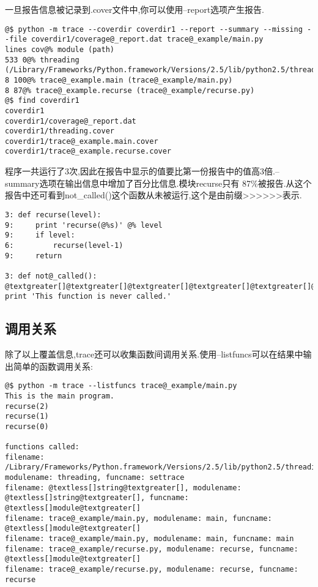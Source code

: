 \documentclass[letterpaper,10pt,english]{manual}
\begin{document}
一旦报告信息被记录到.cover文件中,你可以使用--report选项产生报告.

\begin{Verbatim}[commandchars=@\[\]]
@$ python -m trace --coverdir coverdir1 --report --summary --missing --file coverdir1/coverage@_report.dat trace@_example/main.py
lines cov@% module (path)
533 0@% threading (/Library/Frameworks/Python.framework/Versions/2.5/lib/python2.5/threading.py)
8 100@% trace@_example.main (trace@_example/main.py)
8 87@% trace@_example.recurse (trace@_example/recurse.py)
@$ find coverdir1
coverdir1
coverdir1/coverage@_report.dat
coverdir1/threading.cover
coverdir1/trace@_example.main.cover
coverdir1/trace@_example.recurse.cover
\end{Verbatim}

程序一共运行了3次,因此在报告中显示的值要比第一份报告中的值高3倍.--summary选项在输出信息中增加了百分比信息.模块recurse只有 87\%被报告.从这个报告中还可看到not\_called()这个函数从未被运行,这个是由前缀\textgreater{}\textgreater{}\textgreater{}\textgreater{}\textgreater{}\textgreater{}表示.

\begin{Verbatim}[commandchars=@\[\]]
3: def recurse(level):
9:     print 'recurse(@%s)' @% level
9:     if level:
6:         recurse(level-1)
9:     return

3: def not@_called():
@textgreater[]@textgreater[]@textgreater[]@textgreater[]@textgreater[]@textgreater[] print 'This function is never called.'
\end{Verbatim}


\subsection{调用关系}

除了以上覆盖信息,trace还可以收集函数间调用关系.使用--listfuncs可以在结果中输出简单的函数调用关系:

\begin{Verbatim}[commandchars=@\[\]]
@$ python -m trace --listfuncs trace@_example/main.py
This is the main program.
recurse(2)
recurse(1)
recurse(0)

functions called:
filename: /Library/Frameworks/Python.framework/Versions/2.5/lib/python2.5/threading.py, modulename: threading, funcname: settrace
filename: @textless[]string@textgreater[], modulename: @textless[]string@textgreater[], funcname: @textless[]module@textgreater[]
filename: trace@_example/main.py, modulename: main, funcname: @textless[]module@textgreater[]
filename: trace@_example/main.py, modulename: main, funcname: main
filename: trace@_example/recurse.py, modulename: recurse, funcname: @textless[]module@textgreater[]
filename: trace@_example/recurse.py, modulename: recurse, funcname: recurse
\end{Verbatim}
\end{document}
